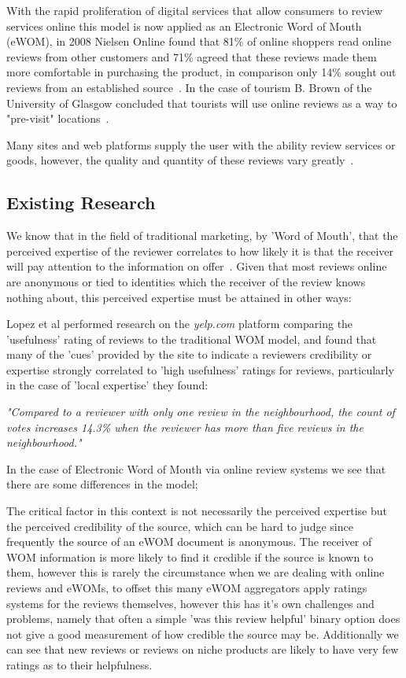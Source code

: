 With the rapid proliferation of digital services that allow consumers to review services online this model is now applied as an Electronic Word of Mouth (eWOM), in 2008 Nielsen Online found that 81\% of online shoppers read online reviews from other customers and 71\% agreed that these reviews made them more comfortable in purchasing the product, in comparison only 14\% sought out reviews from an established source~\cite{Nielsen}. In the case of tourism B. Brown of the University of Glasgow concluded that tourists will use online reviews as a way to "pre-visit" locations~\cite{Brown}.

Many sites and web platforms supply the user with the ability review services or goods, however, the quality and quantity of these reviews vary greatly~\cite{Zhang}.

\subsection{Existing Research}
We know that in the field of traditional marketing, by 'Word of Mouth', that the perceived expertise of the reviewer correlates to how likely it is that the receiver will pay attention to the information on offer~\cite{Bansal}. Given that most reviews online are anonymous or tied to identities which the receiver of the review knows nothing about, this perceived expertise must be attained in other ways:

Lopez et al\cite{Lopez} performed research on the \emph{yelp.com} platform comparing the 'usefulness' rating of reviews to the traditional WOM model, and found that many of the 'cues' provided by the site to indicate a reviewers credibility or expertise strongly correlated to 'high usefulness' ratings for reviews, particularly in the case of 'local expertise' they found: 

\emph{"Compared to a reviewer with only one review in the neighbourhood, the count of votes increases 14.3\% when the reviewer has more than five reviews in the neighbourhood."}

In the case of Electronic Word of Mouth via online review systems we see that there are some differences in the model;

The critical factor in this context is not necessarily the perceived expertise but the perceived credibility of the source, which can be hard to judge since frequently the source of an eWOM document is anonymous. The receiver of WOM information is more likely to find it credible if the source is known to them\cite{Bart}, however this is rarely the circumstance when we are dealing with online reviews and eWOMs, to offset this many eWOM aggregators apply ratings systems for the reviews themselves\cite{Krestel}, however this has it's own challenges and problems, namely that often a simple 'was this review helpful' binary option does not give a good measurement of how credible the source may be. Additionally we can see that new reviews or reviews on niche products are likely to have very few ratings as to their helpfulness\cite{Ghose}. 

